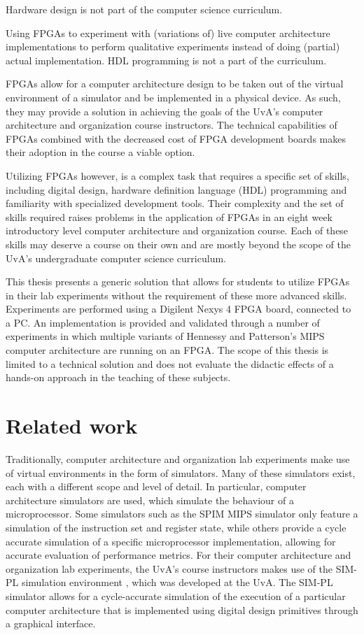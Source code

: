 \documentclass[openright]{template/uva-bachelor-thesis}
\begin{document}
Hardware design is not part of the computer science curriculum.

Using FPGAs to experiment with (variations of) live computer architecture implementations to perform qualitative experiments instead of doing (partial) actual implementation. HDL programming is not a part of the curriculum.

FPGAs allow for a computer architecture design to be taken out of the virtual environment of a simulator and be implemented in a physical device. As such, they may provide a solution in achieving the goals of the UvA's computer architecture and organization course instructors. The technical capabilities of FPGAs combined with the decreased cost of FPGA development boards makes their adoption in the course a viable option. 

Utilizing FPGAs however, is a complex task that requires a specific set of skills, including digital design, hardware definition language (HDL) programming and familiarity with specialized development tools. Their complexity and the set of skills required raises problems in the application of FPGAs in an eight week introductory level computer architecture and organization course. Each of these skills may deserve a course on their own and are mostly beyond the scope of the UvA's undergraduate computer science curriculum. 

This thesis presents a generic solution that allows for students to utilize FPGAs in their lab experiments without the requirement of these more advanced skills. Experiments are performed using a Digilent Nexys 4 FPGA board, connected to a PC. An implementation is provided and validated through a number of experiments in which multiple variants of Hennessy and Patterson's MIPS computer architecture are running on an FPGA. The scope of this thesis is limited to a technical solution and does not evaluate the didactic effects of a hands-on approach in the teaching of these subjects.

\section{Related work}
Traditionally, computer architecture and organization lab experiments make use of virtual environments in the form of simulators. Many of these simulators exist, each with a different scope and level of detail. In particular, computer architecture simulators are used, which simulate the behaviour of a microprocessor. Some simulators such as the SPIM MIPS simulator \cite{spim} only feature a simulation of the instruction set and register state, while others provide a cycle accurate simulation of a specific microprocessor implementation, allowing for accurate evaluation of performance metrics. For their computer architecture and organization lab experiments, the UvA's course instructors makes use of the SIM-PL simulation environment \cite{simpl}, which was developed at the UvA. The SIM-PL simulator allows for a cycle-accurate simulation of the execution of a particular computer architecture that is implemented using digital design primitives through a graphical interface.
\end{document}
